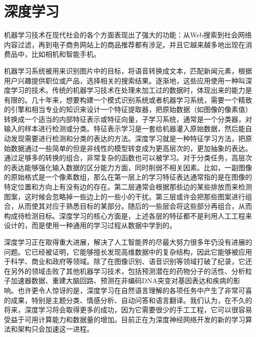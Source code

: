 \documentclass[UTF8]{ctexart}
\begin{document}
\section*{深度学习}

\par 机器学习技术在现代社会的各个方面表现出了强大的功能：从Web搜索到社会网络内容过滤，再到电子商务网站上的商品推荐都有涉足。并且它越来越多地出现在消费品中，比如相机和智能手机。

\par 机器学习系统被用来识别图片中的目标，将语音转换成文本，匹配新闻元素，根据用户兴趣提供职位或产品，选择相关的搜索结果。逐渐地，这些应用使用一种叫深度学习的技术。传统的机器学习技术在处理未加工过的数据时，体现出来的能力是有限的。几十年来，想要构建一个模式识别系统或者机器学习系统，需要一个精致的引擎和相当专业的知识来设计一个特征提取器，把原始数据（如图像的像素值）转换成一个适当的内部特征表示或特征向量，子学习系统，通常是一个分类器，对输入的样本进行检测或分类。特征表示学习是一套给机器灌入原始数据，然后能自动发现需要进行检测和分类的表达的方法。深度学习就是一种特征学习方法，把原始数据通过一些简单的但是非线性的模型转变成为更高层次的，更加抽象的表达。通过足够多的转换的组合，非常复杂的函数也可以被学习。对于分类任务，高层次的表达能够强化输入数据的区分能力方面，同时削弱不相关因素。比如，一副图像的原始格式是一个像素数组，那么在第一层上的学习特征表达通常指的是在图像的特定位置和方向上有没有边的存在。第二层通常会根据那些边的某些排放而来检测图案，这时候会忽略掉一些边上的一些小的干扰。第三层或许会把那些图案进行组合，从而使其对应于熟悉目标的某部分。随后的一些层会将这些部分再组合，从而构成待检测目标。深度学习的核心方面是，上述各层的特征都不是利用人工工程来设计的，而是使用一种通用的学习过程从数据中学到的。

\par 深度学习正在取得重大进展，解决了人工智能界的尽最大努力很多年仍没有进展的问题。它已经被证明，它能够擅长发现高维数据中的复杂结构，因此它能够被应用于科学、商业和政府等领域。除了在图像识别、语音识别等领域打破了纪录，它还在另外的领域击败了其他机器学习技术，包括预测潜在的药物分子的活性、分析粒子加速器数据、重建大脑回路、预测在非编码DNA突变对基因表达和疾病的影响。也许更令人惊讶的是，深度学习在自然语言理解的各项任务中产生了非常可喜的成果，特别是主题分类、情感分析、自动问答和语言翻译。我们认为，在不久的将来，深度学习将会取得更多的成功，因为它需要很少的手工工程，它可以很容易受益于可用计算能力和数据量的增加。目前正在为深度神经网络开发的新的学习算法和架构只会加速这一进程。
\end{document}
